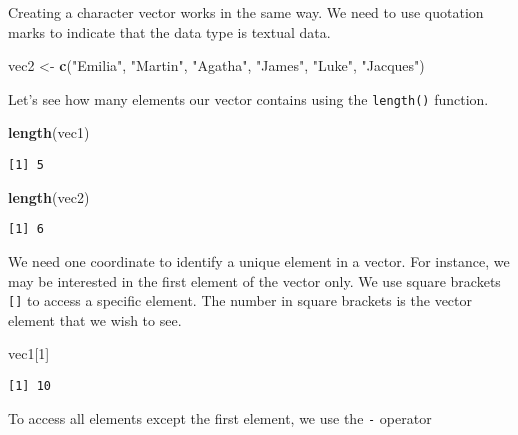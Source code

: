 \documentclass[]{article}
\newenvironment{Shaded}{\begin{snugshade}}{\end{snugshade}}
\newcommand{\DecValTok}[1]{\textcolor[rgb]{0.00,0.00,0.81}{#1}}
\newcommand{\KeywordTok}[1]{\textcolor[rgb]{0.13,0.29,0.53}{\textbf{#1}}}
\newcommand{\NormalTok}[1]{#1}
\newcommand{\StringTok}[1]{\textcolor[rgb]{0.31,0.60,0.02}{#1}}
\begin{document}
Creating a character vector works in the same way. We need to use quotation marks to indicate that the data type is textual data.

\begin{Shaded}
\begin{Highlighting}[]
\NormalTok{vec2 <-}\StringTok{ }\KeywordTok{c}\NormalTok{(}\StringTok{"Emilia"}\NormalTok{, }\StringTok{"Martin"}\NormalTok{, }\StringTok{"Agatha"}\NormalTok{, }\StringTok{"James"}\NormalTok{, }\StringTok{"Luke"}\NormalTok{, }\StringTok{"Jacques"}\NormalTok{)}
\end{Highlighting}
\end{Shaded}

Let's see how many elements our vector contains using the \texttt{length()} function.

\begin{Shaded}
\begin{Highlighting}[]
\KeywordTok{length}\NormalTok{(vec1)}
\end{Highlighting}
\end{Shaded}

\begin{verbatim}
[1] 5
\end{verbatim}

\begin{Shaded}
\begin{Highlighting}[]
\KeywordTok{length}\NormalTok{(vec2)}
\end{Highlighting}
\end{Shaded}

\begin{verbatim}
[1] 6
\end{verbatim}

We need one coordinate to identify a unique element in a vector. For instance, we may be interested in the first element of the vector only. We use square brackets \texttt{{[}{]}} to access a specific element. The number in square brackets is the vector element that we wish to see.

\begin{Shaded}
\begin{Highlighting}[]
\NormalTok{vec1[}\DecValTok{1}\NormalTok{]}
\end{Highlighting}
\end{Shaded}

\begin{verbatim}
[1] 10
\end{verbatim}

To access all elements except the first element, we use the \texttt{-} operator
\end{document}

